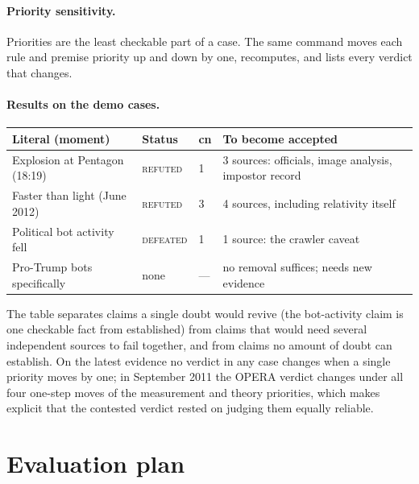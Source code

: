 \documentclass[11pt]{article}
\begin{document}
\paragraph{Priority sensitivity.}
Priorities are the least checkable part of a case. The same command
moves each rule and premise priority up and down by one, recomputes, and
lists every verdict that changes.

\paragraph{Results on the demo cases.}
\begin{center}\small
\begin{tabularx}{\linewidth}{@{}l l l X@{}}
\toprule
Literal (moment) & Status & cn & To become accepted\\
\midrule
Explosion at Pentagon (18:19) & \textsc{refuted} & 1 & 3 sources: officials, image analysis, impostor record\\
Faster than light (June 2012) & \textsc{refuted} & 3 & 4 sources, including relativity itself\\
Political bot activity fell & \textsc{defeated} & 1 & 1 source: the crawler caveat\\
Pro-Trump bots specifically & none & --- & no removal suffices; needs new evidence\\
\bottomrule
\end{tabularx}
\end{center}
The table separates claims a single doubt would revive (the bot-activity
claim is one checkable fact from established) from claims that would
need several independent sources to fail together, and from claims no
amount of doubt can establish. On the latest evidence no verdict in any
case changes when a single priority moves by one; in September 2011 the
OPERA verdict changes under all four one-step moves of the measurement
and theory priorities, which makes explicit that the contested verdict
rested on judging them equally reliable.

\section{Evaluation plan}
\label{sec:eval}
\end{document}
